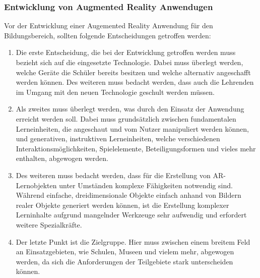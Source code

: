 \subsubsection{Entwicklung von Augmented Reality Anwendugen}
Vor der Entwicklung einer Augemented Reality Anwendung für den Bildungsbereich, sollten folgende Entscheidungen getroffen werden:
\begin{enumerate}
\item Die erste Entscheidung, die bei der Entwicklung getroffen werden muss bezieht sich auf die eingesetzte Technologie. Dabei muss überlegt werden, welche Geräte die Schüler bereits besitzen und welche alternativ angeschafft werden können. Des weiteren muss bedacht werden, dass auch die Lehrenden im Umgang mit den neuen Technologie geschult werden müssen.
\item Als zweites muss überlegt werden, was durch den Einsatz der Anwendung erreicht werden soll. Dabei muss grundsätzlich zwischen fundamentalen Lerneinheiten, die angeschaut und vom Nutzer manipuliert werden können, und generativen, instruktiven Lerneinheiten, welche verschiedenen Interaktionsmöglichkeiten, Spielelemente, Beteiligungsformen und vieles mehr enthalten,  abgewogen werden. 
\item Des weiteren muss bedacht werden, dass für die Erstellung von AR-Lernobjekten unter Umständen komplexe Fähigkeiten notwendig sind. Während einfache, dreidimensionale Objekte einfach anhand von Bildern realer Objekte generiert werden können, ist die Erstellung komplexer Lerninhalte aufgrund mangelnder Werkzeuge sehr aufwendig und erfordert weitere Spezialkräfte.
\item Der letzte Punkt ist die Zielgruppe. Hier muss zwischen einem breitem Feld an Einsatzgebieten, wie Schulen, Museen und vielem mehr, abgewogen werden, da sich die Anforderungen der Teilgebiete stark unterscheiden können. 
\end{enumerate}
\citep[Kapitel 1.7]{geroimenko:ar-in-education}

